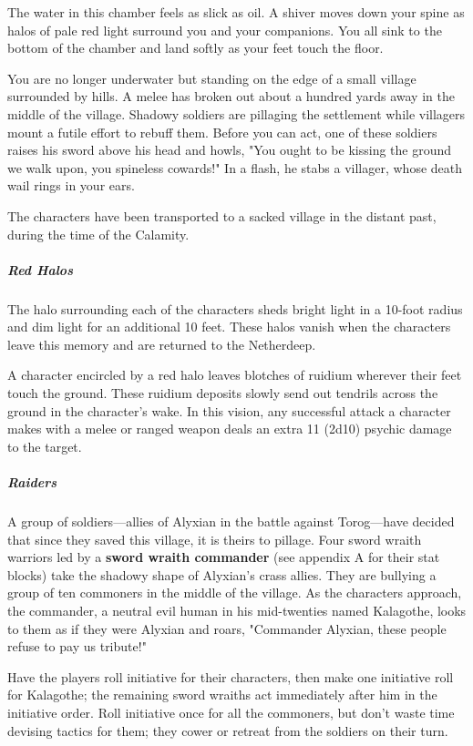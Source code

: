 \documentclass[10pt,a4paper,twoside,bg=print,twocolumn,openany,nodeprecatedcode]{dndbook}
\begin{document}
\begin{DndReadAloud}{}
The water in this chamber feels as slick as oil. A shiver moves down your spine as halos of pale red light surround you and your companions. You all sink to the bottom of the chamber and land softly as your feet touch the floor.

You are no longer underwater but standing on the edge of a small village surrounded by hills. A melee has broken out about a hundred yards away in the middle of the village. Shadowy soldiers are pillaging the settlement while villagers mount a futile effort to rebuff them. Before you can act, one of these soldiers raises his sword above his head and howls, "You ought to be kissing the ground we walk upon, you spineless cowards!" In a flash, he stabs a villager, whose death wail rings in your ears.

\end{DndReadAloud}

The characters have been transported to a sacked village in the distant past, during the time of the Calamity.

\subparagraph{Red Halos}
The halo surrounding each of the characters sheds bright light in a 10-foot radius and dim light for an additional 10 feet. These halos vanish when the characters leave this memory and are returned to the Netherdeep.

A character encircled by a red halo leaves blotches of ruidium wherever their feet touch the ground. These ruidium deposits slowly send out tendrils across the ground in the character's wake. In this vision, any successful attack a character makes with a melee or ranged weapon deals an extra 11 (2d10) psychic damage to the target.

\subparagraph{Raiders}
A group of soldiers—allies of Alyxian in the battle against Torog—have decided that since they saved this village, it is theirs to pillage. Four sword wraith warriors led by a \textbf{sword wraith commander} (see appendix A for their stat blocks) take the shadowy shape of Alyxian's crass allies. They are bullying a group of ten commoners in the middle of the village. As the characters approach, the commander, a neutral evil human in his mid-twenties named Kalagothe, looks to them as if they were Alyxian and roars, "Commander Alyxian, these people refuse to pay us tribute!"

Have the players roll initiative for their characters, then make one initiative roll for Kalagothe; the remaining sword wraiths act immediately after him in the initiative order. Roll initiative once for all the commoners, but don't waste time devising tactics for them; they cower or retreat from the soldiers on their turn.
\end{document}
